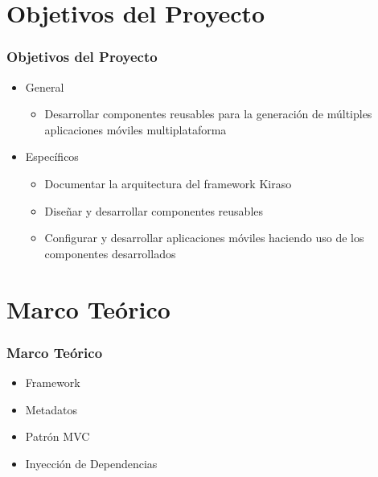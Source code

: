 \documentclass{beamer}
\begin{document}

\section{Objetivos del Proyecto}


\begin{frame}[fragile]
\frametitle{Objetivos del Proyecto}
\begin{itemize}
	\item General
	\begin{itemize}
		\item Desarrollar componentes reusables para la generación de múltiples aplicaciones móviles multiplataforma
	\end{itemize}
	\item Específicos
	\begin{itemize}
		\item Documentar la arquitectura del framework Kiraso
		\item Diseñar y desarrollar componentes reusables
		\item Configurar y desarrollar aplicaciones móviles haciendo uso de los componentes desarrollados
	\end{itemize} 
\end{itemize}

\end{frame}



\section{Marco Teórico}


\begin{frame}[fragile]
\frametitle{Marco Teórico}
\begin{itemize}
	\item Framework
	\item Metadatos
	\item Patrón MVC
	\item Inyección de Dependencias
\end{itemize}

\end{frame}

\end{document}
